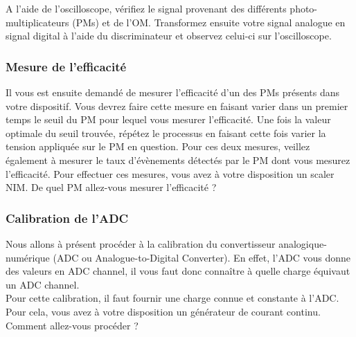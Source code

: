 A l'aide de l'oscilloscope, vérifiez le signal provenant des différents photo-multiplicateurs (PMs) et de l'OM. Transformez ensuite votre signal analogue en signal digital à l'aide du discriminateur et observez celui-ci sur l'oscilloscope.
\subsubsection{Mesure de l'efficacité}

Il vous est ensuite demandé de mesurer l'efficacité d'un des PMs présents dans votre dispositif. Vous devrez faire cette mesure en faisant varier dans un premier temps le seuil du PM pour lequel vous mesurer l'efficacité. Une fois la valeur optimale du seuil trouvée, répétez le processus en faisant cette fois varier la tension appliquée sur le PM en question. Pour ces deux mesures, veillez également à mesurer le taux d'évènements détectés par le PM dont vous mesurez l'efficacité. Pour effectuer ces mesures, vous avez à votre disposition un scaler NIM. De quel PM allez-vous mesurer l'efficacité ?


\subsubsection{Calibration de l'ADC}

Nous allons à présent procéder à la calibration du convertisseur analogique-numérique (ADC ou Analogue-to-Digital Converter). En effet, l'ADC vous donne des valeurs en ADC channel, il vous faut donc connaître à quelle charge équivaut un ADC channel.\\

Pour cette calibration, il faut fournir une charge connue et constante à l'ADC. Pour cela, vous avez à votre disposition un générateur de courant continu. Comment allez-vous procéder ? 


